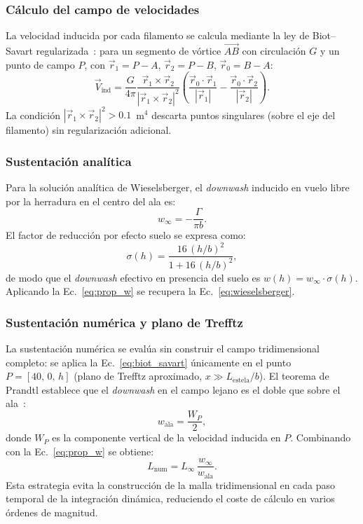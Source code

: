 \documentclass[twocolumn]{article}
\begin{document}
\subsubsection{Cálculo del campo de velocidades}

La velocidad inducida por cada filamento se calcula mediante la ley de
Biot--Savart regularizada~\cite{katz2001}: para un segmento de vórtice
$\overrightarrow{AB}$ con circulación $G$ y un punto de campo $P$,
con $\vec{r}_1 = P - A$, $\vec{r}_2 = P - B$, $\vec{r}_0 = B - A$:
\begin{equation}
  \vec{V}_\text{ind} = \frac{G}{4\pi}
  \frac{\vec{r}_1 \times \vec{r}_2}{|\vec{r}_1 \times \vec{r}_2|^2}
  \left(
    \frac{\vec{r}_0 \cdot \vec{r}_1}{|\vec{r}_1|} -
    \frac{\vec{r}_0 \cdot \vec{r}_2}{|\vec{r}_2|}
  \right).
  \label{eq:biot_savart}
\end{equation}
La condición $|\vec{r}_1 \times \vec{r}_2|^2 > 0.1$~m$^4$ descarta
puntos singulares (sobre el eje del filamento) sin regularización
adicional.

\subsubsection{Sustentación analítica}

Para la solución analítica de Wieselsberger, el \textit{downwash} inducido
en vuelo libre por la herradura en el centro del ala es:
\begin{equation}
  w_\infty = -\frac{\Gamma}{\pi b}.
  \label{eq:winf}
\end{equation}
El factor de reducción por efecto suelo se expresa como:
\begin{equation}
  \sigma(h) = \frac{16\,(h/b)^2}{1 + 16\,(h/b)^2},
  \label{eq:sigma}
\end{equation}
de modo que el \textit{downwash} efectivo en presencia del suelo es
$w(h) = w_\infty \cdot \sigma(h)$. Aplicando la Ec.~\eqref{eq:prop_w}
se recupera la Ec.~\eqref{eq:wieselsberger}.

\subsubsection{Sustentación numérica y plano de Trefftz}

La sustentación numérica se evalúa sin construir el campo tridimensional
completo: se aplica la Ec.~\eqref{eq:biot_savart} únicamente en el punto
$P = [40,\, 0,\, h]$ (plano de Trefftz aproximado, $x \gg L_\text{estela}/b$).
El teorema de Prandtl establece que el \textit{downwash} en el campo lejano
es el doble que sobre el ala~\cite{prandtl1921}:
\begin{equation}
  w_\text{ala} = \frac{W_P}{2},
  \label{eq:trefftz}
\end{equation}
donde $W_P$ es la componente vertical de la velocidad inducida en $P$.
Combinando con la Ec.~\eqref{eq:prop_w} se obtiene:
\begin{equation}
  L_\text{num} = L_\infty \, \frac{w_\infty}{w_\text{ala}}.
  \label{eq:L_num}
\end{equation}
Esta estrategia evita la construcción de la malla tridimensional en cada
paso temporal de la integración dinámica, reduciendo el coste de cálculo
en varios órdenes de magnitud.
\end{document}
